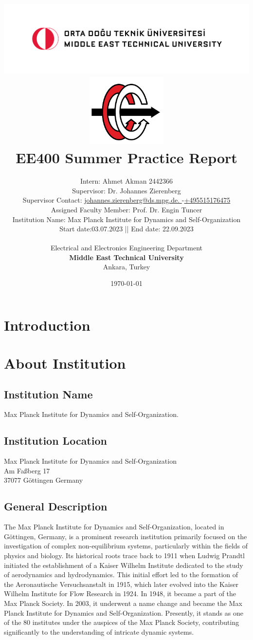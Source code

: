 \documentclass[a4paper,12pt]{article}
\title{
\includegraphics[width=17cm]{odtu.png} \\
\includegraphics[width=4cm]{eee.png} \\
\vspace*{0.5in}
\textbf{EE400 Summer Practice Report}
\vspace*{0.25in}
}
\author{Intern: Ahmet Akman 2442366\\
Supervisor: Dr. Johannes Zierenberg\\
Supervisor Contact: \href{mailto: johannes.zierenberg@ds.mpg.de}{ johannes.zierenberg@ds.mpg.de. }-\href{tel:+495515176475}{+495515176475}\\
Assigned Faculty Member: Prof. Dr. Engin Tuncer\\
Institution Name: Max Planck Institute for Dynamics and Self-Organization\\
Start date:03.07.2023 || End date: 22.09.2023\\
        \vspace*{0.25in} \\
        Electrical and Electronics Engineering Department\\
        \textbf{Middle East Technical University}\\
        Ankara, Turkey
       } \date{\today}
\begin{document}


%


\maketitle

\newpage
\tableofcontents
\newpage
\section{Introduction}
\section{About Institution}
\subsection{Institution Name}
Max Planck Institute for Dynamics and Self-Organization.
\subsection{Institution Location}
Max Planck Institute for Dynamics and Self-Organization \\
Am Faßberg 17 \\
37077 Göttingen Germany
\subsection{General Description}
The Max Planck Institute for Dynamics and Self-Organization, located in Göttingen, Germany, is a prominent research institution primarily focused on the investigation of complex non-equilibrium systems, particularly within the fields of physics and biology. Its historical roots trace back to 1911 when Ludwig Prandtl initiated the establishment of a Kaiser Wilhelm Institute dedicated to the study of aerodynamics and hydrodynamics. This initial effort led to the formation of the Aeronautische Versuchsanstalt in 1915, which later evolved into the Kaiser Wilhelm Institute for Flow Research in 1924. In 1948, it became a part of the Max Planck Society. In 2003, it underwent a name change and became the Max Planck Institute for Dynamics and Self-Organization. Presently, it stands as one of the 80 institutes under the auspices of the Max Planck Society, contributing significantly to the understanding of intricate dynamic systems.
\end{document}
